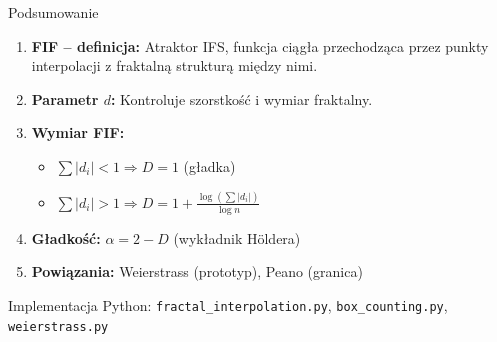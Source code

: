 \documentclass[10pt]{beamer}
\begin{document}
\begin{frame}{Podsumowanie}
    \begin{enumerate}
        \item \textbf{FIF -- definicja:} Atraktor IFS, funkcja ciągła przechodząca przez punkty interpolacji z fraktalną strukturą między nimi.

        \vspace{0.2cm}
        \item \textbf{Parametr $d$:} Kontroluje szorstkość i wymiar fraktalny.

        \vspace{0.2cm}
        \item \textbf{Wymiar FIF:}
        \begin{itemize}
            \item $\sum |d_i| < 1 \Rightarrow D = 1$ (gładka)
            \item $\sum |d_i| > 1 \Rightarrow D = 1 + \frac{\log(\sum |d_i|)}{\log n}$
        \end{itemize}

        \vspace{0.2cm}
        \item \textbf{Gładkość:} $\alpha = 2 - D$ (wykładnik Höldera)

        \vspace{0.2cm}
        \item \textbf{Powiązania:} Weierstrass (prototyp), Peano (granica)
    \end{enumerate}

    \vspace{0.3cm}
    \begin{block}{Implementacja}
        Python: \texttt{fractal\_interpolation.py}, \texttt{box\_counting.py}, \texttt{weierstrass.py}
    \end{block}
\end{frame}
\end{document}
